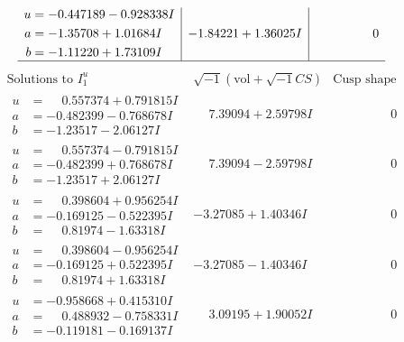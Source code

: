 \documentclass[1p]{elsarticle_modified}
\theoremstyle{definition}
\newcommand{\I}{\sqrt{-1}}
\begin{document}
$$\begin{array}{c|c|c}
\begin{aligned}
u &= -0.447189 - 0.928338 I \\
a &= -1.35708 + 1.01684 I \\
b &= -1.11220 + 1.73109 I\end{aligned}
 & -1.84221 + 1.36025 I & \phantom{-0.000000 } 0\\
 \hline 
 \end{array}$$\newpage$$\begin{array}{c|c|c}  
\text{Solutions to }I^u_{1}& \I (\text{vol} + \sqrt{-1}CS) & \text{Cusp shape}\\
 \hline 
\begin{aligned}
u &= \phantom{-}0.557374 + 0.791815 I \\
a &= -0.482399 - 0.768678 I \\
b &= -1.23517 - 2.06127 I\end{aligned}
 & \phantom{-}7.39094 + 2.59798 I & \phantom{-0.000000 } 0 \\ \hline\begin{aligned}
u &= \phantom{-}0.557374 - 0.791815 I \\
a &= -0.482399 + 0.768678 I \\
b &= -1.23517 + 2.06127 I\end{aligned}
 & \phantom{-}7.39094 - 2.59798 I & \phantom{-0.000000 } 0 \\ \hline\begin{aligned}
u &= \phantom{-}0.398604 + 0.956254 I \\
a &= -0.169125 - 0.522395 I \\
b &= \phantom{-}0.81974 - 1.63318 I\end{aligned}
 & -3.27085 + 1.40346 I & \phantom{-0.000000 } 0 \\ \hline\begin{aligned}
u &= \phantom{-}0.398604 - 0.956254 I \\
a &= -0.169125 + 0.522395 I \\
b &= \phantom{-}0.81974 + 1.63318 I\end{aligned}
 & -3.27085 - 1.40346 I & \phantom{-0.000000 } 0 \\ \hline\begin{aligned}
u &= -0.958668 + 0.415310 I \\
a &= \phantom{-}0.488932 - 0.758331 I \\
b &= -0.119181 - 0.169137 I\end{aligned}
 & \phantom{-}3.09195 + 1.90052 I & \phantom{-0.000000 } 0 \\ \hline\begin{aligned}

\end{aligned}
\end{array}$$
\end{document}
